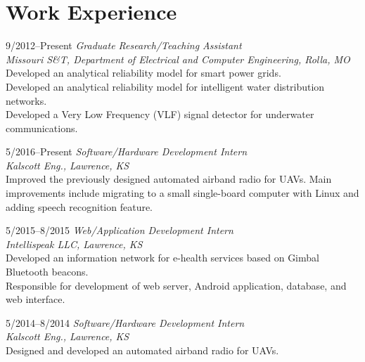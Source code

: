 \documentclass[10pt]{article}
\newlength{\Vspace}
\newlength{\Vspace}
\begin{document}
\section{Work Experience}

\begin{CV}

\item[9/2012--Present] \textit{Graduate Research/Teaching Assistant} \\
    \textit{Missouri S\&T, Department of Electrical and Computer Engineering, Rolla, MO}\vspace{\Vspace} \\
    Developed an analytical reliability model for smart power grids. \\
    Developed an analytical reliability model for intelligent water distribution networks. \\
    Developed a Very Low Frequency (VLF) signal detector for underwater communications.

\item[5/2016--Present] \textit{Software/Hardware Development Intern} \\
    \textit{Kalscott Eng., Lawrence, KS}\vspace{\Vspace} \\
    Improved the previously designed automated airband radio for UAVs. Main improvements include migrating to a small single-board computer with Linux and adding speech recognition feature.

\item[5/2015--8/2015] \textit{Web/Application Development Intern} \\
    \textit{Intellispeak LLC, Lawrence, KS}\vspace{\Vspace} \\
    Developed an information network for e-health services based on Gimbal Bluetooth beacons. \\
    Responsible for development of web server, Android application, database, and web interface.

\item[5/2014--8/2014] \textit{Software/Hardware Development Intern} \\
    \textit{Kalscott Eng., Lawrence, KS}\vspace{\Vspace} \\
    Designed and developed an automated airband radio for UAVs.


\end{CV}
\end{document}
